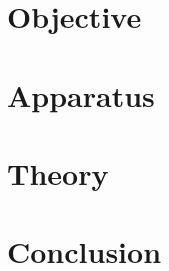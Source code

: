 \documentclass[a4paper]{article}
\begin{document}
 \newpage
{\hypersetup{linkcolor=black} %
\tableofcontents\thispagestyle{empty}}
\newpage
{}
\section{Objective}

\section{Apparatus}

\section{Theory}

% 
\section{Conclusion}



\end{document}
